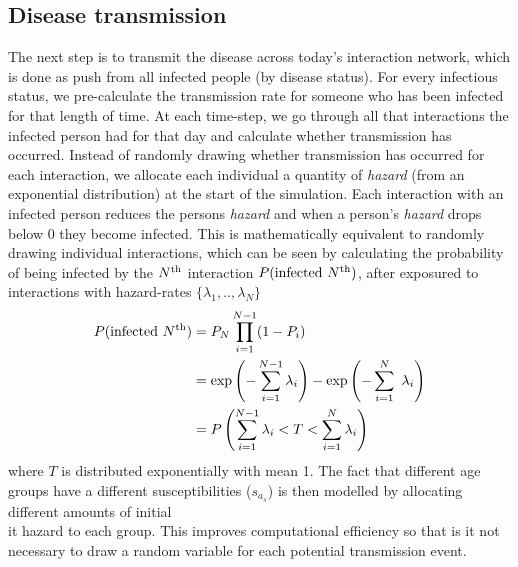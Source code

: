 \documentclass[11pt, oneside]{amsart}   	%
\begin{document}
\subsection{Disease transmission}
The next step is to transmit the disease across today's interaction network, which is done as push from all infected people (by disease status).
For every infectious status, we pre-calculate the transmission rate for someone who has been infected for that length of time.
At each time-step, we go through all that interactions the infected person had for that day and calculate whether transmission has occurred.
Instead of randomly drawing whether transmission has occurred for each interaction, we allocate each individual a quantity of {\it hazard} (from an exponential distribution) at the start of the simulation.
Each interaction with an infected person reduces the persons {\it hazard} and when a person's {\it hazard} drops below 0 they become infected. 
This is mathematically equivalent to randomly drawing individual interactions, which can be seen by calculating the probability of  being infected by the $N^{\rm th}$ interaction  $P({\rm infected} \  N^{\rm th})$, after exposured to interactions with hazard-rates $\{ \lambda_1,..,\lambda_N \}$
\begin{align*}
P({\rm infected} \  N^{\rm th}) 
&= P_N \prod_{i=1}^{N-1} ( 1 - P_i) \\
&= \exp\left( -\sum_{i=1}^{N-1} \lambda_i \right) - \exp\left( -\sum_{i=1}^{N} \ \lambda_i\right) \\
&= P \left(  \sum_{i=1}^{N-1} \lambda_i  < T <  \sum_{i=1}^{N} \lambda_i \right)
\end{align*}
where $T$ is distributed exponentially with mean 1. 
The fact that different age groups have a different susceptibilities ($s_{a_s}$) is then modelled by allocating different amounts of initial {\\it hazard} to each group.
This improves computational efficiency so that is it not necessary to draw a random variable for each potential transmission event.

\renewcommand{\bibname}{References}

 
\end{document}
